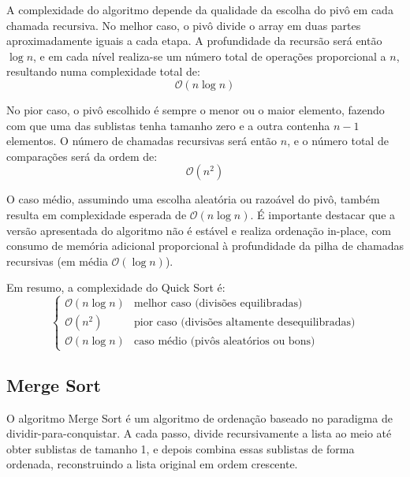 \documentclass[conference]{IEEEtran}
\begin{document}
A complexidade do algoritmo depende da qualidade da escolha do pivô em cada chamada recursiva. No melhor caso, o pivô divide o array em duas partes aproximadamente iguais a cada etapa. A profundidade da recursão será então \(\log n\), e em cada nível realiza-se um número total de operações proporcional a \(n\), resultando numa complexidade total de:
\[
\mathcal{O}(n \log n)
\]

No pior caso, o pivô escolhido é sempre o menor ou o maior elemento, fazendo com que uma das sublistas tenha tamanho zero e a outra contenha \(n - 1\) elementos. O número de chamadas recursivas será então \(n\), e o número total de comparações será da ordem de:
\[
\mathcal{O}(n^2)
\]

O caso médio, assumindo uma escolha aleatória ou razoável do pivô, também resulta em complexidade esperada de \(\mathcal{O}(n \log n)\). É importante destacar que a versão apresentada do algoritmo não é estável e realiza ordenação in-place, com consumo de memória adicional proporcional à profundidade da pilha de chamadas recursivas (em média \(\mathcal{O}(\log n)\)).

Em resumo, a complexidade do Quick Sort é:
\[
\begin{cases}
\mathcal{O}(n \log n) & \text{melhor caso (divisões equilibradas)} \\
\mathcal{O}(n^2) & \text{pior caso (divisões altamente desequilibradas)} \\
\mathcal{O}(n \log n) & \text{caso médio (pivôs aleatórios ou bons)}
\end{cases}
\]


\subsection{Merge Sort}

O algoritmo Merge Sort é um algoritmo de ordenação baseado no paradigma de dividir-para-conquistar. A cada passo, divide recursivamente a lista ao meio até obter sublistas de tamanho 1, e depois combina essas sublistas de forma ordenada, reconstruindo a lista original em ordem crescente.
\end{document}

